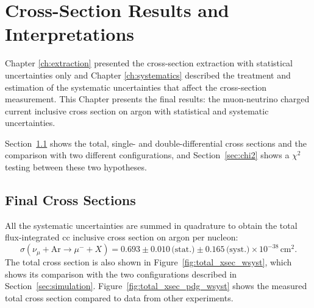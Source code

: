 \chapter{Cross-Section Results and Interpretations}
\label{ch:cross_section_results}



Chapter \ref{ch:extraction} presented the cross-section extraction with statistical uncertainties only and Chapter \ref{ch:systematics} described the treatment and estimation of the systematic uncertainties that affect the cross-section measurement. This Chapter presents the final results: the muon-neutrino charged current inclusive cross section on argon with statistical and systematic uncertainties. 

Section~\ref{sec:final} shows the total, single- and double-differential cross sections and the comparison with two different \g configurations, and Section~\ref{sec:chi2} shows a $\chi^2$ testing between these two hypotheses. 

\section{Final Cross Sections}
\label{sec:final}

All the systematic uncertainties are summed in quadrature to obtain the total flux-integrated \acrshort{cc} inclusive cross section on argon per nucleon:
\begin{equation}
\sigma(\nu_\mu + \text{Ar} \rightarrow \mu^- + X) = 0.693 
              \pm 0.010 \, \text{(stat.)} 
              \pm 0.165 \, \text{(syst.)} 
              \times 10^{-38} \,\text{cm}^2.
\end{equation}
The total cross section is also shown in Figure~\ref{fig:total_xsec_wsyst}, which shows its comparison with the two \g configurations described in Section~\ref{sec:simulation}. Figure~\ref{fig:total_xsec_pdg_wsyst} shows the measured total cross section compared to data from other experiments. 



